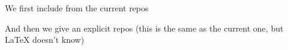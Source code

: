 \documentclass[minimal]{omdoc}
\begin{document}
We first include from the current repos


And then we give an explicit repos (this is the same as  the current one, but {\LaTeX}
doesn't know)

\end{document}
